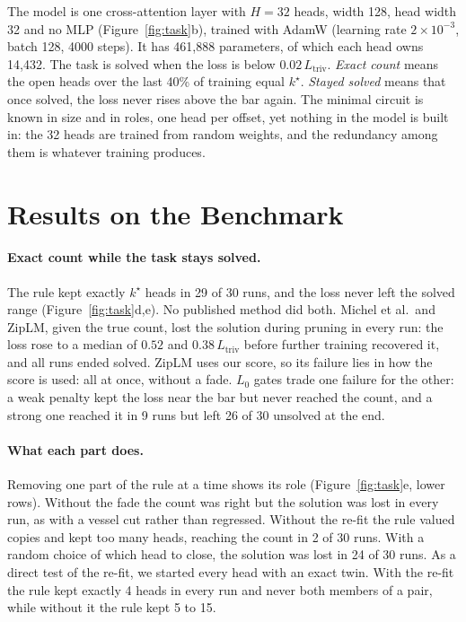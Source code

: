 \documentclass[letterpaper]{article} %
\newcommand{\Ltriv}{L_{\mathrm{triv}}}
\newcommand{\kstar}{k^\star}
\begin{document}
The model is one cross-attention layer with $H=32$ heads, width 128, head width 32 and no MLP (Figure~\ref{fig:task}b), trained with AdamW (learning rate $2\times10^{-3}$, batch 128, 4000 steps). It has 461{,}888 parameters, of which each head owns 14{,}432. The task is solved when the loss is below $0.02\,\Ltriv$. \emph{Exact count} means the open heads over the last 40\% of training equal $\kstar$. \emph{Stayed solved} means that once solved, the loss never rises above the bar again. The minimal circuit is known in size and in roles, one head per offset, yet nothing in the model is built in: the 32 heads are trained from random weights, and the redundancy among them is whatever training produces.

\section{Results on the Benchmark}

\paragraph{Exact count while the task stays solved.} The rule kept exactly $\kstar$ heads in 29 of 30 runs, and the loss never left the solved range (Figure~\ref{fig:task}d,e). No published method did both. Michel et al.\ and ZipLM, given the true count, lost the solution during pruning in every run: the loss rose to a median of $0.52$ and $0.38\,\Ltriv$ before further training recovered it, and all runs ended solved. ZipLM uses our score, so its failure lies in how the score is used: all at once, without a fade. $L_0$ gates trade one failure for the other: a weak penalty kept the loss near the bar but never reached the count, and a strong one reached it in 9 runs but left 26 of 30 unsolved at the end.

\paragraph{What each part does.} Removing one part of the rule at a time shows its role (Figure~\ref{fig:task}e, lower rows). Without the fade the count was right but the solution was lost in every run, as with a vessel cut rather than regressed. Without the re-fit the rule valued copies and kept too many heads, reaching the count in 2 of 30 runs. With a random choice of which head to close, the solution was lost in 24 of 30 runs. As a direct test of the re-fit, we started every head with an exact twin. With the re-fit the rule kept exactly 4 heads in every run and never both members of a pair, while without it the rule kept 5 to 15.
\end{document}
